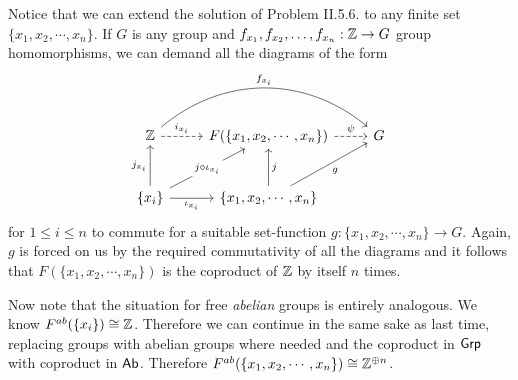 \begin{solution}
	Notice that we can extend the solution of Problem II.5.6. to any finite set $\{ x_1, x_2, \cdots, x_n \}$. If $G$ is any group and $f_{x_1}, f_{x_2}, \dots, f_{x_n}: \mathbb{Z} \to G$ group homomorphisms, we can demand all the diagrams of the form
	\begin{equation*}
		\begin{tikzcd}[row sep=large]
			\Zs
			\arrow[r, dashrightarrow, "i_{x_i}"]
			\arrow[rr, bend left=40, "f_{x_i}"]
			& F(\{x_1, x_2, \cdots, x_n \})
			\arrow[r, dashrightarrow, "\psi"]
			& G \\
			\{x_i \}
			\arrow[u, "j_{x_i}"]
			\arrow[r, "\iota_{x_i}"']
			\arrow[ur, "j \circ \iota_{x_i}" description]
			& \{ x_1, x_2, \cdots, x_n \}
			\arrow[u, "j"']
			\arrow[ur, "g"']
			&
		\end{tikzcd}
	\end{equation*}
	for $1 \leq i \leq n$ to commute for a suitable set-function $g: \{ x_1, x_2, \cdots, x_n \} \to G$. Again, $g$ is forced on us by the required commutativity of all the diagrams and it follows that $F(\{x_1, x_2, \cdots, x_n \})$ is the coproduct of $\mathbb{Z}$ by itself $n$ times.
	
	Now note that the situation for free \emph{abelian} groups is entirely analogous. We know $F^{ab}(\{x_i\}) \cong \mathbb{Z}$. Therefore we can continue in the same sake as last time, replacing groups with abelian groups where needed and the coproduct in $\mathsf{Grp}$ with coproduct in $\mathsf{Ab}$. Therefore $F^{ab}(\{x_1, x_2, \cdots, x_n\}) \cong \mathbb{Z}^{\oplus n}$.
\end{solution}

\begin{problem}
\end{problem}

